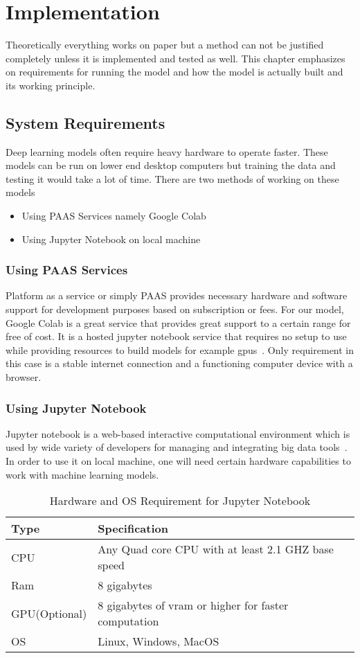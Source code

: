 \chapter{Implementation} \label{ch:implementation}
Theoretically everything works on paper but a method can not be justified completely unless it is implemented and tested as well. This chapter emphasizes on requirements for running the model and how the model is actually built and its working principle.

\section{System Requirements}
Deep learning models often require heavy hardware to operate faster. These models can be run on lower end desktop computers but training the data and testing it would take a lot of time. There are two methods of working on these models
\begin{itemize}
\item Using PAAS Services namely Google Colab
\item Using Jupyter Notebook on local machine
\end{itemize} 
\subsection{Using PAAS Services}
Platform as a service or simply PAAS provides necessary hardware and software support for development purposes based on subscription or fees. For our model, Google Colab is a great service that provides great support to a certain range for free of cost. It is a hosted jupyter notebook service that requires no setup to use while providing resources to build models for example gpus~\cite{url1}. Only requirement in this case is a stable internet connection and a functioning computer device with a browser.
\subsection{Using Jupyter Notebook}
Jupyter notebook is a web-based interactive computational environment which is used by wide variety of developers for managing and integrating big data tools~\cite{url2}. In order to use it on local machine, one will need certain hardware capabilities to work with machine learning models.
\begin{table}
\caption{Hardware and OS Requirement for Jupyter Notebook}
\begin{tabular}{|l|l|}
\hline
Type & Specification \\
\hline
CPU & Any Quad core CPU with at least 2.1 GHZ base speed \\
\hline
Ram & 8 gigabytes \\
\hline
GPU(Optional) & 8 gigabytes of vram or higher for faster computation \\
\hline
OS & Linux, Windows, MacOS \\
\hline
\end{tabular}
\end{table}


